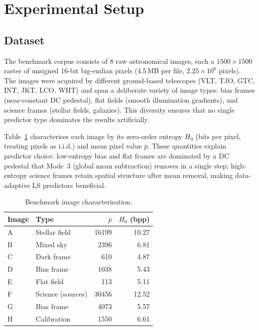 \section{Experimental Setup}
\label{sec:setup}

\subsection{Dataset}
The benchmark corpus consists of 8 raw astronomical images, each a
$1500\times1500$ raster of unsigned 16-bit big-endian pixels (4.5\,MB per
file, $2.25\times10^6$ pixels). The images were acquired by different
ground-based telescopes (VLT, TJO, GTC, INT, JKT, LCO, WHT) and span a
deliberate variety of image types: bias frames (near-constant DC pedestal),
flat fields (smooth illumination gradients), and science frames (stellar
fields, galaxies). This diversity ensures that no single predictor type
dominates the results artificially.

Table~\ref{tab:images} characterises each image by its zero-order entropy
$H_0$ (bits per pixel, treating pixels as i.i.d.) and mean pixel value
$\bar{p}$. These quantities explain predictor choice: low-entropy bias and flat
frames are dominated by a DC pedestal that Mode~3 (global mean subtraction)
removes in a single step; high-entropy science frames retain spatial structure
after mean removal, making data-adaptive LS predictors beneficial.

\begin{table}[H]
\centering
\caption{Benchmark image characterisation.}
\label{tab:images}
\small
\begin{tabular}{llrr}
\toprule
Image & Type & $\bar{p}$ & $H_0$ (bpp) \\
\midrule
A & Stellar field     & 16199 & 10.27 \\
B & Mixed sky         &  2396 &  6.81 \\
C & Dark frame        &   610 &  4.87 \\
D & Bias frame        &  1038 &  5.43 \\
E & Flat field        &   113 &  5.11 \\
F & Science (sources) & 30456 & 12.52 \\
G & Bias frame        &  4073 &  5.57 \\
H & Calibration       &  1550 &  6.61 \\
\bottomrule
\end{tabular}
\end{table}

